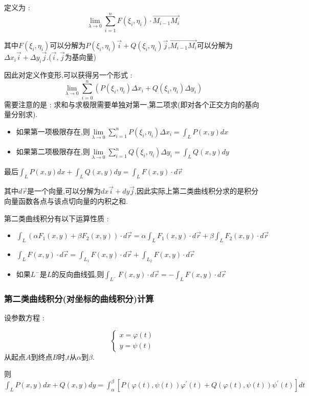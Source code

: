 \documentclass[UTF8,12pt]{ctexbook}
\newcommand{\limNormal}[1]{\lim\limits_{#1}}
\newcommand{\derivative}{^\prime}
\newcommand{\upDownSum}[2]{\sum\limits_{#2}^{#1}}
\newcommand{\definiteIntegral}[2]{\int^{#1}_{#2}}
\newcommand{\pathIntegral}[1]{\int_{#1}}
\begin{document}
{{{{    定义为 :
    $$
      \limNormal{\lambda \to 0}\upDownSum{n}{i = 1}F(\xi_i,\eta_i)\cdot\vec{M_{i - 1}M_i}
    $$

    其中$F(\xi_i,\eta_i)$可以分解为$P(\xi_i,\eta_i)\vec{i} + Q(\xi_i,\eta_i)\vec{j}$,$\vec{M_{i - 1}M_i}$可以分解为$\Delta x_i\vec{i} + \Delta y_i\vec{j}$.($\vec{i},\vec{j}$为基向量)

    因此对定义作变形,可以获得另一个形式 :
    $$
    \limNormal{\lambda \to 0}\upDownSum{n}{i = 0}(P(\xi_i,\eta_i)\Delta x_i + Q(\xi_i,\eta_i)\Delta y_i)
    $$
    需要注意的是 : 求和与求极限需要单独对第一,第二项求(即对各个正交方向的基向量分别求).

    \begin{itemize}
      \item 如果第一项极限存在,则$\limNormal{\lambda \to 0}\upDownSum{n}{i = 1}P(\xi_i,\eta_i)\Delta x_i = \pathIntegral{L}P(x,y)dx$
      \item 如果第二项极限存在,则$\limNormal{\lambda \to 0}\upDownSum{n}{i = 1}Q(\xi_i,\eta_i)\Delta y_i = \pathIntegral{L}Q(x,y)dy$
    \end{itemize}

    最后$\pathIntegral{L}P(x,y)dx + \pathIntegral{L}Q(x,y)dy = \pathIntegral{L}F(x,y) \cdot d\vec{r}$

    其中$d\vec{r}$是一个向量,可以分解为$dx\vec{i} + dy\vec{j}$,因此实际上第二类曲线积分求的是积分向量函数各点与该点切向量的内积之和.

    第二类曲线积分有以下运算性质 :
    \begin{itemize}
      \item $\pathIntegral{L}(\alpha F_1(x,y) + \beta F_2(x,y)) \cdot d\vec{r} = \alpha\pathIntegral{L}F_1(x,y) \cdot d\vec{r} + \beta\pathIntegral{L}F_2(x,y) \cdot d\vec{r}$
      \item $\pathIntegral{L}F(x,y) \cdot d\vec{r} = \pathIntegral{L_1}F(x,y) \cdot d\vec{r} + \pathIntegral{L_2}F(x,y) \cdot d\vec{r}$
      \item 如果$L^-$是$L$的反向曲线弧,则$\pathIntegral{L^-}F(x,y) \cdot d\vec{r} = -\pathIntegral{L}F(x,y) \cdot d\vec{r}$
    \end{itemize}
    }%

    \subsubsection{第二类曲线积分(对坐标的曲线积分)计算}{
      设参数方程 :
      \begin{center}
        $$
          \begin{cases}
            x = \varphi(t) \\
            y = \psi(t)
          \end{cases}
        $$
        从起点$A$到终点$B$时,$t$从$\alpha$到$\beta$.
      \end{center}
      则$\pathIntegral{L}P(x,y)dx + Q(x,y)dy = \definiteIntegral{\beta}{\alpha}[P(\varphi(t),\psi(t))\varphi\derivative(t) + Q(\varphi(t),\psi(t))\psi\derivative(t)]dt$

}}}}
\end{document}
